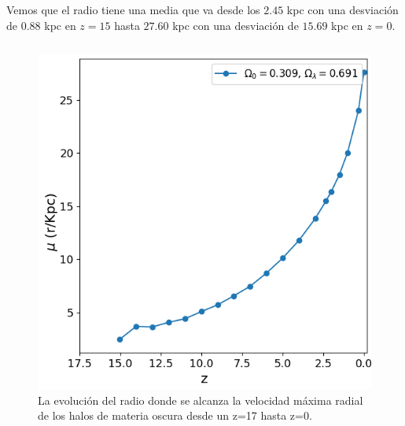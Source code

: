 \documentclass{beamer}
\begin{document}
	\begin{frame}
		\small Vemos que el radio tiene una media que va desde los $2.45$ kpc con una desviación de $0.88$ kpc en $z=15$ hasta $27.60$ kpc con una desviación de $15.69$ kpc en $z=0$.
		
		\begin{columns}[t]
			\begin{column}{.5\textwidth}
				\begin{figure}
					\centering
					\includegraphics[scale=0.3]{RunCanonica/VMaxRad_Mean_RunCanonica.png}
					\caption{\footnotesize La evolución del radio donde se alcanza la velocidad máxima radial de los halos de materia oscura desde un z=17 hasta z=0.}
					\label{fig:Canon-VMAxRadMean}
				\end{figure}
			\end{column}


\end{columns}
\end{frame}
\end{document}

